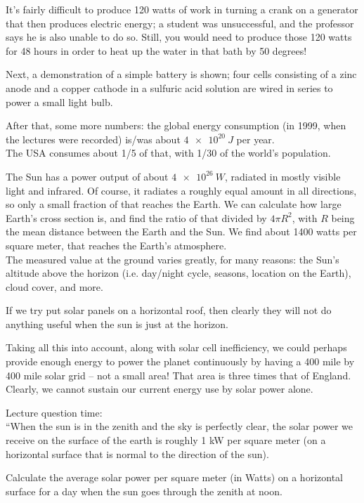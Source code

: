It's fairly difficult to produce 120 watts of work in turning a crank on a generator that then produces electric energy; a student was unsuccessful, and the professor says he is also unable to do so. Still, you would need to produce those 120 watts for 48 hours in order to heat up the water in that bath by 50 degrees!

Next, a demonstration of a simple battery is shown; four cells consisting of a zinc anode and a copper cathode in a sulfuric acid solution are wired in series to power a small light bulb.

After that, some more numbers: the global energy consumption (in 1999, when the lectures were recorded) is/was about $\SI{4e20}{J}$ per year.\\
The USA consumes about 1/5 of that, with 1/30 of the world's population.

The Sun has a power output of about $\SI{4e26}{W}$, radiated in mostly visible light and infrared. Of course, it radiates a roughly equal amount in all directions, so only a small fraction of that reaches the Earth. We can calculate how large Earth's cross section is, and find the ratio of that divided by $4 \pi R^2$, with $R$ being the mean distance between the Earth and the Sun. We find about 1400 watts per square meter, that reaches the Earth's atmosphere.\\
The measured value at the ground varies greatly, for many reasons: the Sun's altitude above the horizon (i.e. day/night cycle, seasons, location on the Earth), cloud cover, and more.

If we try put solar panels on a horizontal roof, then clearly they will not do anything useful when the sun is just at the horizon.

Taking all this into account, along with solar cell inefficiency, we could perhaps provide enough energy to power the planet continuously by having a 400 mile by 400 mile solar grid -- not a small area! That area is three times that of England. Clearly, we cannot sustain our current energy use by solar power alone.

Lecture question time:\\
``When the sun is in the zenith and the sky is perfectly clear, the solar power we receive on the surface of the earth is roughly 1 kW per square meter (on a horizontal surface that is normal to the direction of the sun).

Calculate the average solar power per square meter (in Watts) on a horizontal surface for a day when the sun goes through the zenith at noon.


